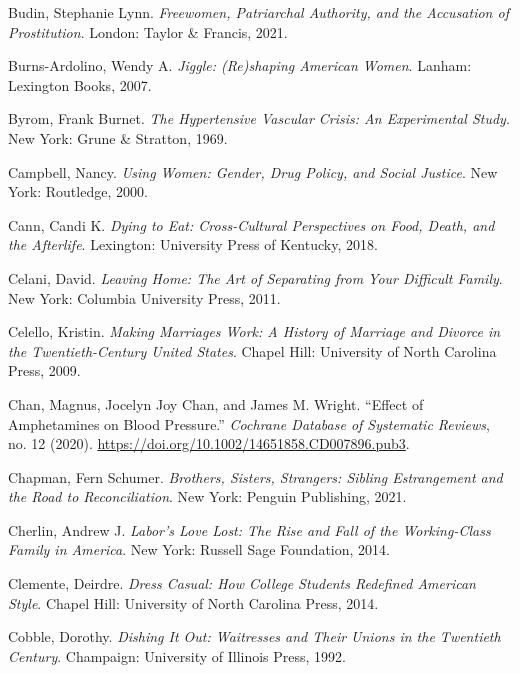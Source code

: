 \documentclass[
  american,
  letterpaper,
]{book}
\newlength{\cslhangindent}
\newenvironment{CSLReferences}[2] %
 {\begin{list}{}{%
  \setlength{\itemindent}{0pt}
  \setlength{\leftmargin}{0pt}
  \setlength{\parsep}{0pt}
  \ifodd #1
   \setlength{\leftmargin}{\cslhangindent}
   \setlength{\itemindent}{-1\cslhangindent}
  \fi
  \setlength{\itemsep}{#2\baselineskip}}}
 {\end{list}}
\begin{document}
\begin{CSLReferences}{1}{0}
Budin, Stephanie Lynn. \emph{Freewomen, Patriarchal Authority, and the
Accusation of Prostitution}. London: Taylor \& Francis, 2021.

Burns-Ardolino, Wendy A. \emph{Jiggle: (Re)shaping American Women}.
Lanham: Lexington Books, 2007.

Byrom, Frank Burnet. \emph{The Hypertensive Vascular Crisis: An
Experimental Study}. New York: Grune \& Stratton, 1969.

Campbell, Nancy. \emph{Using Women: Gender, Drug Policy, and Social
Justice}. New York: Routledge, 2000.

Cann, Candi K. \emph{Dying to Eat: Cross-Cultural Perspectives on Food,
Death, and the Afterlife}. Lexington: University Press of Kentucky,
2018.

Celani, David. \emph{Leaving Home: The Art of Separating from Your
Difficult Family}. New York: Columbia University Press, 2011.

Celello, Kristin. \emph{Making Marriages Work: A History of Marriage and
Divorce in the Twentieth-Century United States}. Chapel Hill: University
of North Carolina Press, 2009.

Chan, Magnus, Jocelyn Joy Chan, and James M. Wright. {``Effect of
Amphetamines on Blood Pressure.''} \emph{Cochrane Database of Systematic
Reviews}, no. 12 (2020).
\url{https://doi.org/10.1002/14651858.CD007896.pub3}.

Chapman, Fern Schumer. \emph{Brothers, Sisters, Strangers: Sibling
Estrangement and the Road to Reconciliation}. New York: Penguin
Publishing, 2021.

Cherlin, Andrew J. \emph{Labor's Love Lost: The Rise and Fall of the
Working-Class Family in America}. New York: Russell Sage Foundation,
2014.

Clemente, Deirdre. \emph{Dress Casual: How College Students Redefined
American Style}. Chapel Hill: University of North Carolina Press, 2014.

Cobble, Dorothy. \emph{Dishing It Out: Waitresses and Their Unions in
the Twentieth Century}. Champaign: University of Illinois Press, 1992.


\end{CSLReferences}
\end{document}
